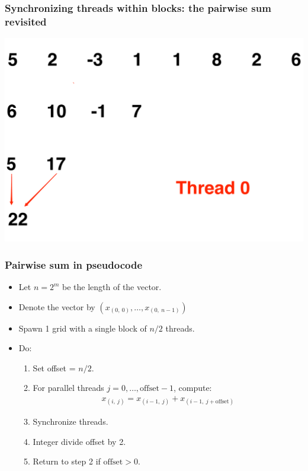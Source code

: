 \documentclass[handout]{beamer}
\numberwithin{equation}{section}
\begin{document}
\begin{frame}
\frametitle{Synchronizing threads within blocks: the pairwise sum revisited} \begin{center}
\includegraphics[scale = .25]{../../fig/psum9}
\end{center}
\end{frame}

\begin{frame}[fragile]
\frametitle{Pairwise sum in pseudocode}
\begin{itemize}
\item Let $n = 2^m$ be the length of the vector.
\pause \item Denote the vector by $(x_{(0, \ 0)}, \ldots, x_{(0, \ n - 1)})$
\pause \item Spawn 1 grid with a single block of $n/2$ threads. 
\pause \item Do:
\begin{enumerate}
 \item Set offset = $n / 2$.
\pause \item For parallel threads $j= 0, \ldots, \text{offset} - 1$, compute:
\begin{align*}
x_{(i, \ j)} = x_{(i-1, \ j)} + x_{(i - 1, \ j + \text{offset})}
\end{align*}
\pause \item Synchronize threads.
\pause \item Integer divide offset by 2.
\pause \item Return to step 2 if $\text{offset} > 0$.
\end{enumerate}
\end{itemize}
\end{frame}
\end{document}
